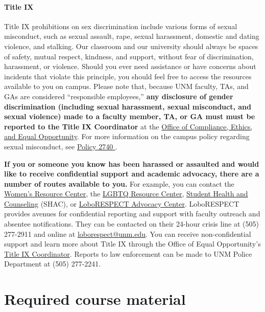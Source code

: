 \documentclass[11pt]{article}
\begin{document}
\vspace{-5pt}
\paragraph{Title IX} Title IX prohibitions on sex discrimination include various forms of sexual misconduct, such as sexual assault, rape, sexual harassment, domestic and dating violence, and stalking. Our classroom and our university should always be spaces of safety, mutual respect, kindness, and support, without fear of discrimination, harassment, or violence. Should you ever need assistance or have concerns about incidents that violate this principle, you should feel free to access the resources available to you on campus. Please note that, because UNM faculty, TAs, and GAs are considered ``responsible employees,'' \textbf{any disclosure of gender discrimination (including sexual harassment, sexual misconduct, and sexual violence) made to a faculty member, TA, or GA must must be reported to the Title IX Coordinator }at the \href{https://oeo.unm.edu/title-ix/title-ix-reporting-obligations.html}{Office of Compliance, Ethics, and Equal Opportunity}. For more information on the campus policy regarding sexual misconduct, see \href{https://policy.unm.edu/university-policies/2000/2740.html}{Policy 2740%
}.\vspace{10pt}

\noindent \textbf{If you or someone you know has been harassed or assaulted and would like to receive confidential support and academic advocacy, there are a number of routes available to you.} For example, you can contact the \href{https://women.unm.edu/}{Women's Resource Center}, the \href{https://lgbtqrc.unm.edu/}{LGBTQ Resource Center}, \href{http://shac.unm.edu/}{Student Health and Counseling} (SHAC), or \href{https://loborespect.unm.edu/}{LoboRESPECT Advocacy Center}. LoboRESPECT provides avenues for confidential reporting and support with faculty outreach and absentee notifications. They can be contacted on their 24-hour crisis line at (505) 277-2911 and online at \href{loborespect@unm.edu}{loborespect@unm.edu}. You can receive non-confidential support and learn more about Title IX through the Office of Equal Opportunity's \href{http://oeo.unm.edu/title-ix/}{Title IX Coordinator}. Reports to law enforcement can be made to UNM Police Department at (505) 277-2241.



\clearpage \section*{Required course material}
\end{document}
